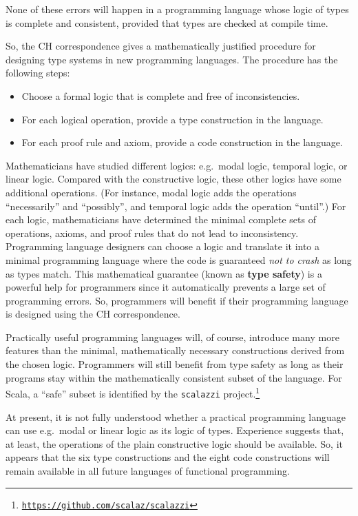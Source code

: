 None of these errors will happen in a programming language whose logic
of types is complete and consistent, provided that types are checked
at compile time. 

So, the CH correspondence gives a mathematically justified procedure
for designing type systems in new programming languages. The procedure
has the following steps:
\begin{itemize}
\item Choose a formal logic that is complete and free of inconsistencies.
\item For each logical operation, provide a type construction in the language.
\item For each proof rule and axiom, provide a code construction in the
language.
\end{itemize}
Mathematicians have studied different logics: e.g.~modal logic, temporal
logic, or linear logic. Compared with the constructive logic, these
other logics have some additional operations. (For instance, modal
logic adds the operations \textsf{``}necessarily\textsf{''} and \textsf{``}possibly\textsf{''}, and
temporal logic adds the operation \textsf{``}until\textsf{''}.) For each logic, mathematicians
have determined the minimal complete sets of operations, axioms, and
proof rules that do not lead to inconsistency. Programming language
designers can choose a logic and translate it into a minimal programming
language where the code is guaranteed \emph{not to crash} as long
as types match. This mathematical guarantee (known as \textbf{type
safety}) is a powerful help for programmers since it automatically
prevents a large set of programming errors. So, programmers will benefit
if their programming language is designed using the CH correspondence.

Practically useful programming languages will, of course, introduce
many more features than the minimal, mathematically necessary constructions
derived from the chosen logic. Programmers will still benefit from
type safety as long as their programs stay within the mathematically
consistent subset of the language. For Scala, a \textsf{``}safe\textsf{''} subset
is identified by the \texttt{scalazzi} project.\footnote{\texttt{\href{https://github.com/scalaz/scalazzi}{https://github.com/scalaz/scalazzi}}}

At present, it is not fully understood whether a practical programming
language can use e.g.~modal or linear logic as its logic of types.
Experience suggests that, at least, the operations of the plain constructive
logic should be available. So, it appears that the six type constructions
and the eight code constructions will remain available in all future
languages of functional programming. 

